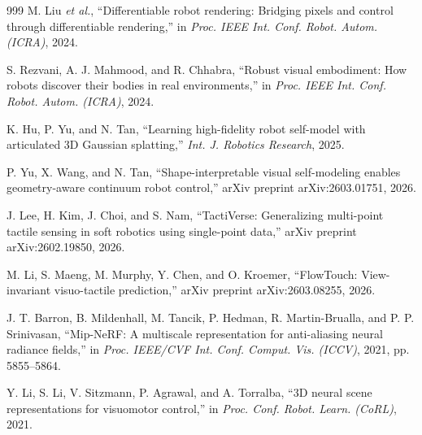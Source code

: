 \documentclass[11pt,a4paper]{article}
\begin{document}
\begin{thebibliography}{999}
M. Liu \textit{et al.}, ``Differentiable robot rendering: Bridging pixels and control through differentiable rendering,'' in \textit{Proc. IEEE Int. Conf. Robot. Autom. (ICRA)}, 2024.




S. Rezvani, A. J. Mahmood, and R. Chhabra, ``Robust visual embodiment: How robots discover their bodies in real environments,'' in \textit{Proc. IEEE Int. Conf. Robot. Autom. (ICRA)}, 2024.




K. Hu, P. Yu, and N. Tan, ``Learning high-fidelity robot self-model with articulated {3D} Gaussian splatting,'' \textit{Int. J. Robotics Research}, 2025.




P. Yu, X. Wang, and N. Tan, ``Shape-interpretable visual self-modeling enables geometry-aware continuum robot control,'' arXiv preprint arXiv:2603.01751, 2026.




J. Lee, H. Kim, J. Choi, and S. Nam, ``{TactiVerse}: Generalizing multi-point tactile sensing in soft robotics using single-point data,'' arXiv preprint arXiv:2602.19850, 2026.




M. Li, S. Maeng, M. Murphy, Y. Chen, and O. Kroemer, ``{FlowTouch}: View-invariant visuo-tactile prediction,'' arXiv preprint arXiv:2603.08255, 2026.




J. T. Barron, B. Mildenhall, M. Tancik, P. Hedman, R. Martin-Brualla, and P. P. Srinivasan, ``{Mip-NeRF}: A multiscale representation for anti-aliasing neural radiance fields,'' in \textit{Proc. IEEE/CVF Int. Conf. Comput. Vis. (ICCV)}, 2021, pp. 5855--5864.




Y. Li, S. Li, V. Sitzmann, P. Agrawal, and A. Torralba, ``{3D} neural scene representations for visuomotor control,'' in \textit{Proc. Conf. Robot. Learn. (CoRL)}, 2021.





\end{thebibliography}
\end{document}
